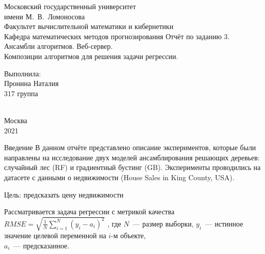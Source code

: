 \documentclass[a4paper,12pt,titlepage,finall]{article}
\begin{document}
	\begin{titlepage}
		\begin{center}
			{\small \sc Московский государственный университет \\имени М.~В.~Ломоносова\\
				Факультет вычислительной математики и кибернетики\\
				Кафедра математических методов прогнозирования}
			\vfill
			{\Large \sc Отчёт по заданию 3. \\ Ансамбли алгоритмов. Веб-сервер. \\ Композиции алгоритмов для решения задачи регрессии.}\\
		\end{center}
		\begin{flushright}
			\vfill {Выполнила:\\
				Пронина Наталия\\
				317 группа\\
				~\\}
		\end{flushright}
		\begin{center}
			\vfill
			{\small Москва\\2021}
		\end{center}
	\end{titlepage}
		
\tableofcontents
\newpage


\begin{section}{Введение}
    В данном отчёте представлено описание экспериментов, которые были направлены на исследование двух моделей ансамблирования решающих деревьев: случайный лес (RF) и градиентный бустинг (GB).
    Эксперименты проводились на датасете с данными о недвижимости (House Sales in King County, USA). \par Цель: предсказать цену недвижимости
    
    Рассматривается задача регрессии с метрикой качества
  $ RMSE = \sqrt{\frac{1}{N} \sum_{i=1}^{N} (y_i - a_i)^2  } $ ,  где $N$~--- размер выборки, $y_i$~--- истинное значение целевой переменной на $i$-м объекте, \\ $a_i$~--- предсказанное.

\end{section}
\end{document}

